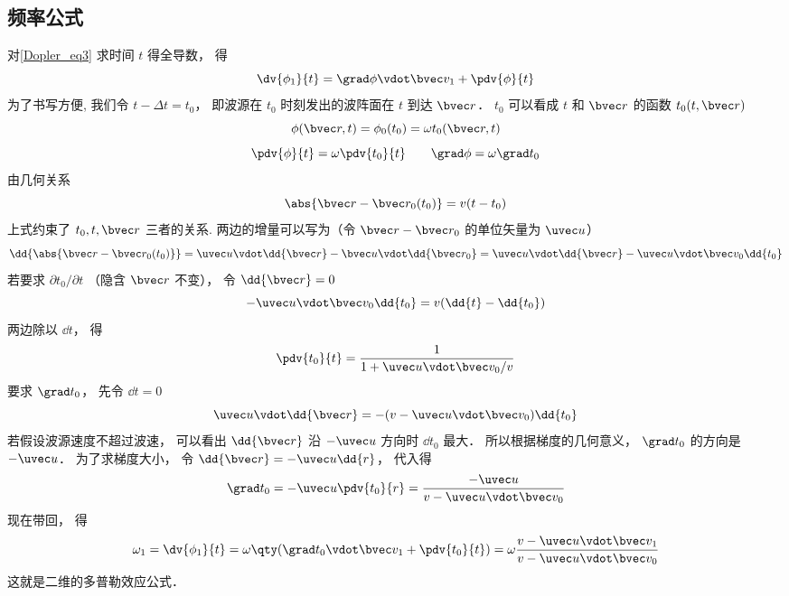 \subsection{频率公式}
对\autoref{Dopler_eq3} 求时间 $t$ 得全导数， 得
\begin{equation}
\dv{\phi_1}{t} = \grad\phi \vdot \bvec v_1 + \pdv{\phi}{t}
\end{equation}
为了书写方便, 我们令 $t - \Delta t = t_0$， 即波源在 $t_0$ 时刻发出的波阵面在 $t$ 到达 $\bvec r$． $t_0$ 可以看成 $t$ 和 $\bvec r$ 的函数  $t_0(t, \bvec r)$
\begin{equation}
\phi(\bvec r, t) =  \phi_0(t_0) = \omega t_0(\bvec r, t)
\end{equation}
\begin{equation}
\pdv{\phi}{t} = \omega \pdv{t_0}{t} \qquad
\grad \phi = \omega \grad t_0
\end{equation}
由几何关系
\begin{equation}
\abs{\bvec r - \bvec r_0(t_0)} = v(t - t_0)
\end{equation}
上式约束了 $t_0, t, \bvec r$ 三者的关系. 两边的增量可以写为（令 $\bvec r - \bvec r_0$ 的单位矢量为 $\uvec u$）
\begin{equation}
\dd{\abs{\bvec r - \bvec r_0(t_0)}} = \uvec u \vdot \dd{\bvec r} - \bvec u \vdot \dd{\bvec r_0} = \uvec u \vdot \dd{\bvec r} - \uvec u \vdot \bvec v_0 \dd{t_0}
\end{equation}
若要求 $\partial t_0 / \partial t$ （隐含 $\bvec r$ 不变）， 令 $\dd{\bvec r} = 0$
\begin{equation}
-\uvec u \vdot \bvec v_0 \dd{t_0} = v(\dd{t} - \dd{t_0})
\end{equation}
两边除以 $\dd{t}$， 得
\begin{equation}
\pdv{t_0}{t} = \frac{1}{1 + \uvec u \vdot \bvec v_0/v}
\end{equation}
要求 $\grad t_0$， 先令 $\dd{t} = 0$
\begin{equation}
\uvec u \vdot \dd{\bvec r} = -(v - \uvec u \vdot \bvec v_0) \dd{t_0}
\end{equation}
若假设波源速度不超过波速， 可以看出 $\dd{\bvec r}$ 沿 $-\uvec u$ 方向时 $\dd{t_0}$ 最大． 所以根据梯度的几何意义， $\grad t_0$ 的方向是 $-\uvec u$． 为了求梯度大小， 令 $\dd{\bvec r} = -\uvec u \dd{r}$， 代入得
\begin{equation}
\grad t_0 = -\uvec u \pdv{t_0}{r} = \frac{ - \uvec u}{v - \uvec u \vdot \bvec v_0}
\end{equation}
现在带回， 得
\begin{equation}
\omega_1 = \dv{\phi_1}{t} = \omega\qty(\grad t_0 \vdot \bvec v_1 + \pdv{t_0}{t}) = \omega \frac{v - \uvec u \vdot \bvec v_1}{v - \uvec u \vdot \bvec v_0}
\end{equation}
这就是二维的多普勒效应公式．
